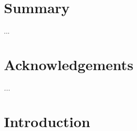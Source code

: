 \documentclass[10pt,a4paper,twoside]{article}
\begin{document}
\section{Summary}
\setcounter{page}{1}
...
\vfill
\newpage

\setcounter{tocdepth}{3}
\tableofcontents



\vfill
\newpage

\section{Acknowledgements}

\textit{...}

\vfill
\newpage

\section{Introduction}
\end{document}
